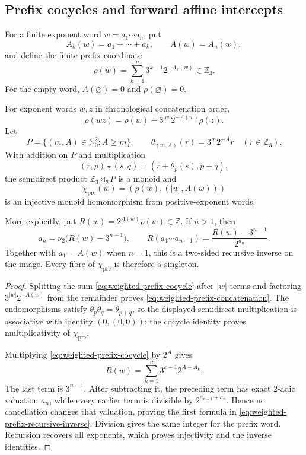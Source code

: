 \subsection{Prefix cocycles and forward affine intercepts}

For a finite exponent word $w=a_1\cdots a_n$, put
\[
 A_k(w)=a_1+\cdots+a_k,
 \qquad
 A(w)=A_n(w),
\]
and define the finite prefix coordinate
\begin{equation}
\label{eq:weighted-prefix-cocycle}
 \rho(w)=\sum_{k=1}^n3^{k-1}2^{-A_k(w)}\in\mathbb Z_3.
\end{equation}
For the empty word, $A(\varnothing)=0$ and $\rho(\varnothing)=0$.

\begin{proposition}
\label{prop:weighted-prefix-cocycle-injection}
For exponent words $w,z$ in chronological concatenation order,
\begin{equation}
\label{eq:weighted-prefix-concatenation}
 \rho(wz)=\rho(w)+3^{|w|}2^{-A(w)}\rho(z).
\end{equation}
Let
\[
 P=\{(m,A)\in\mathbb N_0^2:A\geq m\},
 \qquad
 \theta_{(m,A)}(r)=3^m2^{-A}r\quad(r\in\mathbb Z_3).
\]
With addition on $P$ and multiplication
\[
 (r,p)\star(s,q)=(r+\theta_p(s),p+q),
\]
the semidirect product $\mathbb Z_3\rtimes_\theta P$ is a monoid and
\[
 \chi_{\mathrm{pre}}(w)=(\rho(w),(|w|,A(w)))
\]
is an injective monoid homomorphism from positive-exponent words.

More explicitly, put $R(w)=2^{A(w)}\rho(w)\in\mathbb Z$.  If $n>1$, then
\begin{equation}
\label{eq:weighted-prefix-recursive-inverse}
 a_n=\nu_2\bigl(R(w)-3^{n-1}\bigr),
 \qquad
 R(a_1\cdots a_{n-1})
 =\frac{R(w)-3^{n-1}}{2^{a_n}}.
\end{equation}
Together with $a_1=A(w)$ when $n=1$, this is a two-sided recursive inverse
on the image.  Every fibre of $\chi_{\mathrm{pre}}$ is therefore a singleton.
\end{proposition}

\begin{proof}
Splitting the sum \eqref{eq:weighted-prefix-cocycle} after $|w|$ terms and
factoring $3^{|w|}2^{-A(w)}$ from the remainder proves
\eqref{eq:weighted-prefix-concatenation}.  The endomorphisms satisfy
$\theta_p\theta_q=\theta_{p+q}$, so the displayed semidirect multiplication is
associative with identity $(0,(0,0))$; the cocycle identity proves
multiplicativity of $\chi_{\mathrm{pre}}$.

Multiplying \eqref{eq:weighted-prefix-cocycle} by $2^A$ gives
\[
 R(w)=\sum_{k=1}^n3^{k-1}2^{A-A_k}.
\]
The last term is $3^{n-1}$.  After subtracting it, the preceding term has
exact $2$-adic valuation $a_n$, while every earlier term is divisible by
$2^{a_{n-1}+a_n}$.  Hence no cancellation changes that valuation, proving
the first formula in \eqref{eq:weighted-prefix-recursive-inverse}.  Division
gives the same integer for the prefix word.  Recursion recovers all exponents,
which proves injectivity and the inverse identities.
\end{proof}

